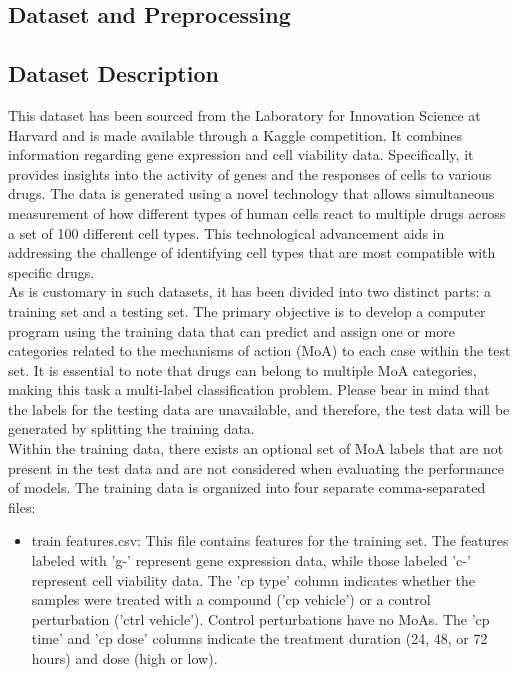 \documentclass{article}
\begin{document}
\begin{multicols}{2}
\section{Dataset and Preprocessing}
\subsection{Dataset Description}
This dataset has been sourced from the Laboratory for Innovation Science at Harvard and is made available through a Kaggle competition. It combines information regarding gene expression and cell viability data. Specifically, it provides insights into the activity of genes and the responses of cells to various drugs. The data is generated using a novel technology that allows simultaneous measurement of how different types of human cells react to multiple drugs across a set of 100 different cell types. This technological advancement aids in addressing the challenge of identifying cell types that are most compatible with specific drugs.\\ 
As is customary in such datasets, it has been divided into two distinct parts: a training set and a testing set. The primary objective is to develop a computer program using the training data that can predict and assign one or more categories related to the mechanisms of action (MoA) to each case within the test set. It is essential to note that drugs can belong to multiple MoA categories, making this task a multi-label classification problem. Please bear in mind that the labels for the testing data are unavailable, and therefore, the test data will be generated by splitting the training data.\\

Within the training data, there exists an optional set of MoA labels that are not present in the test data and are not considered when evaluating the performance of models. The training data is organized into four separate comma-separated files:\\
\begin{itemize}
    \item train features.csv: This file contains features for the training set. The features labeled with 'g-' represent gene expression data, while those labeled 'c-' represent cell viability data. The 'cp type' column indicates whether the samples were treated with a compound ('cp vehicle') or a control perturbation ('ctrl vehicle'). Control perturbations have no MoAs. The 'cp time' and 'cp dose' columns indicate the treatment duration (24, 48, or 72 hours) and dose (high or low).
    

\end{itemize}
\end{multicols}
\end{document}
